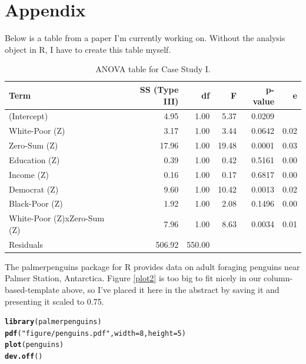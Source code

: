 \documentclass{article}\usepackage[]{graphicx}\usepackage[]{xcolor}
\makeatletter
\newcommand{\hlnum}[1]{\textcolor[rgb]{0.686,0.059,0.569}{#1}}%
\newcommand{\hlsng}[1]{\textcolor[rgb]{0.192,0.494,0.8}{#1}}%
\newcommand{\hldef}[1]{\textcolor[rgb]{0.345,0.345,0.345}{#1}}%
\newcommand{\hlkwc}[1]{\textcolor[rgb]{0.333,0.667,0.333}{#1}}%
\newcommand{\hlkwd}[1]{\textcolor[rgb]{0.737,0.353,0.396}{\textbf{#1}}}%
\newenvironment{kframe}{%
 \def\at@end@of@kframe{}%
 \ifinner\ifhmode%
  \def\at@end@of@kframe{\end{minipage}}%
  \begin{minipage}{\columnwidth}%
 \fi\fi%
 \def\FrameCommand##1{\hskip\@totalleftmargin \hskip-\fboxsep
 \colorbox{shadecolor}{##1}\hskip-\fboxsep
     \hskip-\linewidth \hskip-\@totalleftmargin \hskip\columnwidth}%
 \MakeFramed {\advance\hsize-\width
   \@totalleftmargin\z@ \linewidth\hsize
   \@setminipage}}%
 {\par\unskip\endMakeFramed%
 \at@end@of@kframe}
\newenvironment{knitrout}{}{} %
\makeatother
\begin{document}
\onecolumn
\section{Appendix}


Below is a table from a paper I’m currently working on. Without the analysis object in R, I have to create this table myself.
\begin{table}[H]
\begin{center}
\begin{tabular}{ l  r  r  r  r r}\hline
{Term} & {SS (Type III)} & {df} &
{F} & {p-value} & {e}\\\hline
(Intercept) &4.95 &1.00 &5.37 &0.0209 & \\
White-Poor (Z) &3.17 &1.00 &3.44 &0.0642 & 0.02 \\
Zero-Sum (Z) &17.96 &1.00 &19.48 & 0.0001 & 0.03 \\
Education (Z) &0.39 &1.00 &0.42 &0.5161 & 0.00 \\
Income (Z) &0.16 &1.00 &0.17 &0.6817 & 0.00 \\
Democrat (Z) &9.60 &1.00 &10.42 &0.0013 & 0.02 \\
Black-Poor (Z) &1.92 &1.00 &2.08 &0.1496 & 0.00 \\
White-Poor (Z)xZero-Sum (Z) &7.96 &1.00 &8.63 &0.0034 & 0.01 \\
Residuals &506.92 &550.00 & & &  \\\hline
\end{tabular} \caption{ANOVA table for Case Study I.} \label{full.sleep.tab}
\end{center}
\end{table}
The palmerpenguins package for R \citep{penguins} provides data on adult foraging penguins near Palmer Station, Antarctica. Figure \ref{plot2} is too big to fit nicely in our column-based-template above, so I’ve placed it here in the abstract by saving it and presenting it scaled to 0.75.

\begin{knitrout}\scriptsize
{}\color{fgcolor}\begin{kframe}
\begin{alltt}
\hlkwd{library}\hldef{(palmerpenguins)}
\hlkwd{pdf}\hldef{(}\hlsng{"figure/penguins.pdf"}\hldef{,} \hlkwc{width} \hldef{=} \hlnum{8}\hldef{,} \hlkwc{height} \hldef{=} \hlnum{5}\hldef{)}
\hlkwd{plot}\hldef{(penguins)}
\hlkwd{dev.off}\hldef{()}
\end{alltt}
\end{kframe}
\end{knitrout}
\end{document}
